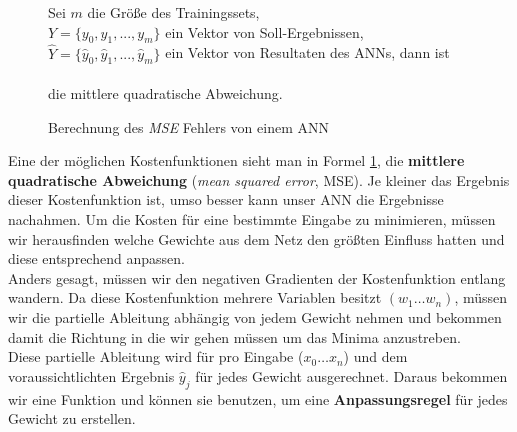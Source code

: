                 \begin{figure}[H]
                    \begin{mdframed}
                        \noindent
                        Sei $m$ die Größe des Trainingssets,\\
                        \hspace*{4.5mm} $Y = \{y_0, y_1,...,y_m\}$ ein Vektor von Soll-Ergebnissen, \\
                        \hspace*{4.5mm} $\widehat{Y} = \{\widehat{y}_0, \widehat{y}_1,...,\widehat{y}_m\}$ ein Vektor von Resultaten des ANNs, dann ist\\[4mm]
                        \hspace*{30mm} \\[4mm]
                        die mittlere quadratische Abweichung.
                    \end{mdframed}
                    \formforfigure
                    \caption{\label{cost-math}Berechnung des \textit{MSE} Fehlers von einem ANN}
                \end{figure}
                \noindent
                Eine der möglichen Kostenfunktionen sieht man in Formel \ref{cost-math}, die \textbf{mittlere quadratische Abweichung} (\textit{mean squared error}, MSE). Je kleiner das Ergebnis dieser Kostenfunktion ist, umso besser kann unser ANN die Ergebnisse nachahmen. Um die Kosten für eine bestimmte Eingabe zu minimieren, müssen wir herausfinden welche Gewichte aus dem Netz den größten Einfluss hatten und diese entsprechend anpassen. \\

                \noindent
                Anders gesagt, müssen wir den negativen Gradienten der Kostenfunktion entlang wandern. Da diese Kostenfunktion mehrere Variablen besitzt $(w_{1} \dots w_{n})$, müssen wir die partielle Ableitung abhängig von jedem Gewicht nehmen und bekommen damit die Richtung in die wir gehen müssen um das Minima anzustreben.\\

                \noindent
                Diese partielle Ableitung wird für pro Eingabe ($x_0 \dots x_n$) und dem voraussichtlichten Ergebnis $\widehat{y}_j$ für jedes Gewicht ausgerechnet. Daraus bekommen wir eine Funktion und können sie benutzen, um eine \textbf{Anpassungsregel} für jedes Gewicht zu erstellen. 

